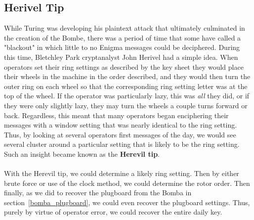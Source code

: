 
\subsection{Herivel Tip}
While Turing was developing his plaintext attack that ultimately
culminated in the creation of the Bombe, there was a period of time
that some have called a "blackout" in which little to no Enigma
messages could be deciphered. During this time, Bletchley Park
cryptanalyst John Herivel had a simple idea. When operators set their
ring settings as described by the key sheet they would place their
wheels in the machine in the order described, and they would then
turn the outer ring on each wheel so that the corresponding ring
setting letter was at the top of the wheel. If the operator was
particularly lazy, this was \emph{all} they did, or if they were only
slightly lazy, they may turn the wheels a couple turns forward or
back. Regardless, this meant that many operators began enciphering
their messages with a window setting that was nearly identical to the
ring setting. Thus, by looking at several operators first messages of
the day, we would see several cluster around a particular setting
that is likely to be the ring setting. Such an insight became known
as the {\bf{Herevil tip}}.
\\\\With the Herevil tip, we could determine a likely ring setting.
Then by either brute force or use of the clock method, we could
determine the rotor order. Then finally, as we did to recover the
plugboard from the Bomba in section~\ref{bomba_plugboard}, we could
even recover the plugboard settings. Thus, purely by virtue of
operator error, we could recover the entire daily key.

